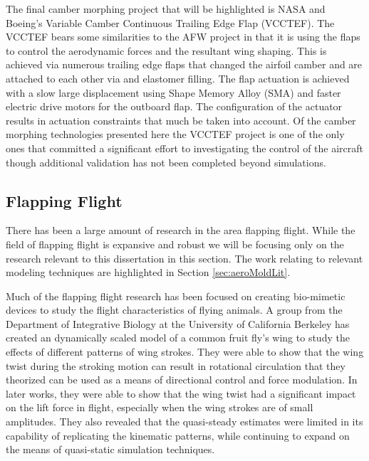 \documentclass[11pt]{ucthesis}
\begin{document}
The final camber morphing project that will be highlighted is NASA and Boeing's Variable Camber Continuous Trailing Edge Flap (VCCTEF). The VCCTEF bears some similarities to the AFW project in that it is using the flaps to control the aerodynamic forces and the resultant wing shaping. This is achieved via numerous trailing edge flaps that changed the airfoil camber and are attached to each other via and elastomer filling. The flap actuation is achieved with a slow large displacement using Shape Memory Alloy (SMA) and faster electric drive motors for the outboard flap.\cite{urnes2013mission} The configuration of the actuator results in actuation constraints that much be taken into account. \cite{swei2014aeroelastic} Of the camber morphing technologies presented here the VCCTEF project is one of the only ones that committed a significant effort to investigating the control of the aircraft\cite{nguyen2012aeroelastic} though additional validation has not been completed beyond simulations.

\subsection{Flapping Flight}
There has been a large amount of research in the area flapping flight. \cite{shyy2010recent} While the field of flapping flight is expansive and robust we will be focusing only on the research relevant to this dissertation in this section. The work relating to relevant modeling techniques are highlighted in Section \ref{sec:aeroMoldLit}. 

Much of the flapping flight research has been focused on creating bio-mimetic devices to study the flight characteristics of flying animals. A group from the Department of Integrative Biology at the University of California Berkeley has created an dynamically scaled model of a common fruit fly's wing to study the effects of different patterns of wing strokes. They were able to show that the wing twist during the stroking motion can result in rotational circulation that they theorized can be used as a means of directional control and force modulation.\cite{dickinson1999wing} In later works, they were able to show that the wing twist had a significant impact on the lift force in flight, especially when the wing strokes are of small amplitudes. They also revealed that the quasi-steady estimates were limited in its capability of replicating the kinematic patterns,\cite{sane2001control} while continuing to expand on the means of quasi-static simulation techniques.\cite{sane2002aerodynamic}
\end{document}
